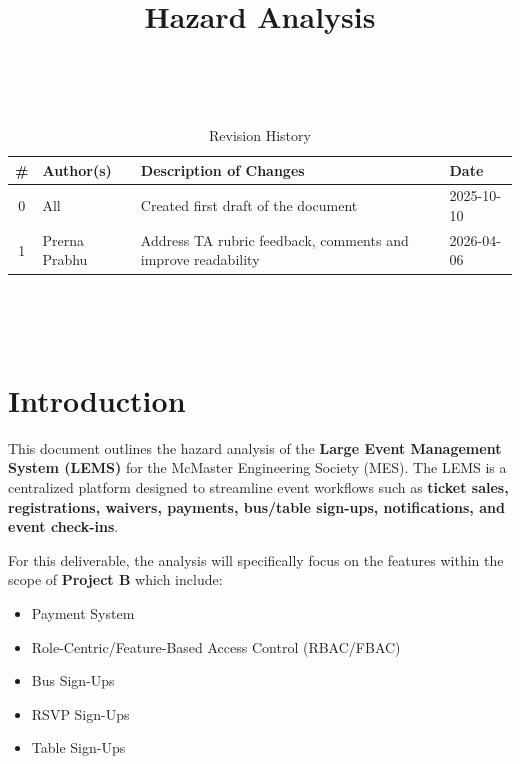 \documentclass{article}
\title{Hazard Analysis\\\progname}
\author{\authname}
\date{}
\begin{document}
\maketitle
\thispagestyle{empty}

~\newpage


\begin{table}[hp]
\caption{Revision History} \label{TblRevisionHistory}
\begin{tabularx}{\textwidth}{c l X l}
\toprule
\textbf{\#} & \textbf{Author(s)} & \textbf{Description of Changes} & \textbf{Date}\\
\midrule
0 & All & Created first draft of the document & 2025-10-10\\
1 & Prerna Prabhu & Address TA rubric feedback, comments and improve readability & 2026-04-06\\
\bottomrule
\end{tabularx}
\end{table}

~\newpage

\tableofcontents

~\newpage



\section{Introduction}

This document outlines the hazard analysis of the \textbf{Large Event Management System (LEMS)} for the McMaster
Engineering Society (MES). The LEMS is a centralized platform designed to streamline event workflows such as
 \textbf{ticket sales, registrations, waivers, payments, bus/table sign-ups, notifications, and event check-ins}.
\newline

\noindent
For this deliverable, the analysis will specifically focus on the features within the scope of \textbf{Project B} which include:

\begin{itemize}
    \item Payment System
    \item Role-Centric/Feature-Based Access Control (RBAC/FBAC)
    \item Bus Sign-Ups
    \item RSVP Sign-Ups
    \item Table Sign-Ups
\end{itemize}
\end{document}
